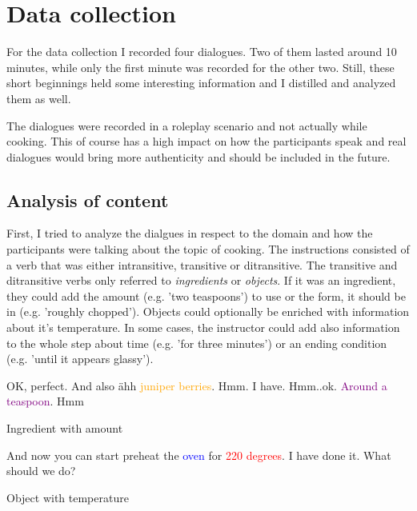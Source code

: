 \documentclass[
	11pt, %
]{fphw}
\newenvironment{captionedDialogue}
    {\captionsetup{
        type=Dialogue,
        skip=2pt,
        belowskip=13pt
        }
    }
    {}
\newenvironment{mydialogue}
    {\begin{snugshade}
     \hrulefill
     \begin{dialogue}}
    {\end{dialogue}
     \hrulefill
     \end{snugshade}}
\begin{document}
\section*{Data collection}
For the data collection I recorded four dialogues. Two of them lasted around 10 minutes, while only the first minute was recorded for the other two. Still, these short beginnings held some interesting information and I distilled and analyzed them as well.

The dialogues were recorded in a roleplay scenario and not actually while cooking. This of course has a high impact on how the participants speak and real dialogues would bring more authenticity and should be included in the future.

\subsection*{Analysis of content}
First, I tried to analyze the dialgues in respect to the domain and how the participants were talking about the topic of cooking. The instructions consisted of a verb that was either intransitive, transitive or ditransitive. The transitive and ditransitive verbs only referred to \emph{ingredients} or \emph{objects}. If it was an ingredient, they could add the amount (e.g. 'two teaspoons') to use or the form, it should be in (e.g. 'roughly chopped'). Objects could optionally be enriched with information about it's temperature. 
In some cases, the instructor could add also information to the whole step about time (e.g. 'for three minutes') or an ending condition (e.g. 'until it appears glassy').

\begin{captionedDialogue}
    \begin{mydialogue}
         OK, perfect. And also ähh \textcolor{orange}{juniper berries}. 
         Hmm. I have.
         Hmm..ok. \textcolor{purple}{Around a teaspoon}.
         Hmm
    \end{mydialogue}
    \caption{Ingredient with amount}
    \label{dia:ingredient}
\end{captionedDialogue}

\begin{captionedDialogue}
    \begin{mydialogue}
         And now you can start preheat the \textcolor{blue}{oven} for \textcolor{red}{220 degrees}. 
         I have done it. What should we do? 
    \end{mydialogue}
    \caption{Object with temperature}
    \label{dia:object}
\end{captionedDialogue}
\end{document}
